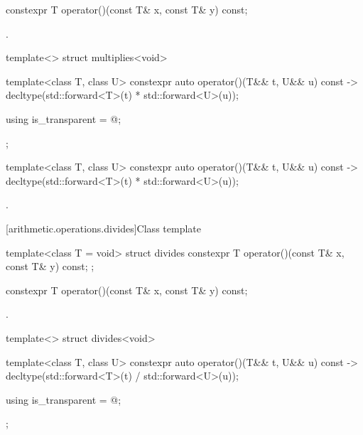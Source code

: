 %
\begin{itemdecl}
constexpr T operator()(const T& x, const T& y) const;
\end{itemdecl}

\begin{itemdescr}
\pnum
\returns
{}.
\end{itemdescr}

%
\begin{itemdecl}
template<> struct multiplies<void> {
  template<class T, class U> constexpr auto operator()(T&& t, U&& u) const
    -> decltype(std::forward<T>(t) * std::forward<U>(u));

  using is_transparent = @\unspec@;
};
\end{itemdecl}

%
\begin{itemdecl}
template<class T, class U> constexpr auto operator()(T&& t, U&& u) const
    -> decltype(std::forward<T>(t) * std::forward<U>(u));
\end{itemdecl}

\begin{itemdescr}
\pnum
\returns
{}.
\end{itemdescr}

[arithmetic.operations.divides]{Class template }

%
\begin{itemdecl}
template<class T = void> struct divides {
  constexpr T operator()(const T& x, const T& y) const;
};
\end{itemdecl}

%
\begin{itemdecl}
constexpr T operator()(const T& x, const T& y) const;
\end{itemdecl}

\begin{itemdescr}
\pnum
\returns
{}.
\end{itemdescr}

%
\begin{itemdecl}
template<> struct divides<void> {
  template<class T, class U> constexpr auto operator()(T&& t, U&& u) const
    -> decltype(std::forward<T>(t) / std::forward<U>(u));

  using is_transparent = @\unspec@;
};
\end{itemdecl}

